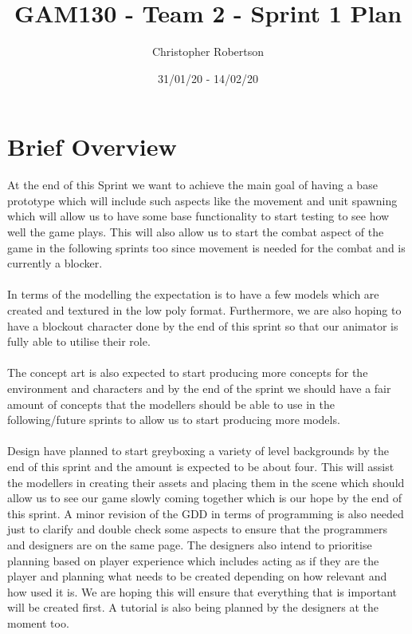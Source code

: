 \documentclass{article}
\title{GAM130 - Team 2 - Sprint 1 Plan}
\author{Christopher Robertson}
\date{31/01/20 - 14/02/20}
\begin{document}
\maketitle

\newpage
\section{Brief Overview}

At the end of this Sprint we want to achieve the main goal of having a base prototype which will include such aspects like the movement and unit spawning which will allow us to have some base functionality to start testing to see how well the game plays. This will also allow us to start the combat aspect of the game in the following sprints too since movement is needed for the combat and is currently a blocker. 
\\
\\
In terms of the modelling the expectation is to have a few models which are created and textured in the low poly format. Furthermore, we are also hoping to have a blockout character done by the end of this sprint so that our animator is fully able to utilise their role.
\\
\\
The concept art is also expected to start producing more concepts for the environment and characters and by the end of the sprint we should have a fair amount of concepts that the modellers should be able to use in the following/future sprints to allow us to start producing more models.
\\
\\
Design have planned to start greyboxing a variety of level backgrounds by the end of this sprint and the amount is expected to be about four. This will assist the modellers in creating their assets and placing them in the scene which should allow us to see our game slowly coming together which is our hope by the end of this sprint. A minor revision of the GDD in terms of programming is also needed just to clarify and double check some aspects to ensure that the programmers and designers are on the same page. The designers also intend to prioritise planning based on player experience which includes acting as if they are the player and planning what needs to be created depending on how relevant and how used it is. We are hoping this will ensure that everything that is important will be created first. A tutorial is also being planned by the designers at the moment too.
\\
\end{document}

